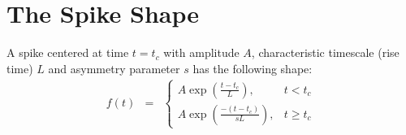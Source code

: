 \documentclass[a4paper, 11pt]{article}
\begin{document}
\section{The Spike Shape}
A spike centered at time $t=t_c$ with amplitude $A$, characteristic timescale
(rise time) $L$ and asymmetry parameter $s$ has the following shape:
\begin{eqnarray}
f(t) &=& \left\{
\begin{array}{lr}
A\exp\left(\frac{t - t_c}{L}\right), & t < t_c\\
A\exp\left(\frac{-(t - t_c)}{sL}\right), & t \geq t_c
\end{array}
\right.
\end{eqnarray}


{}
\end{document}
